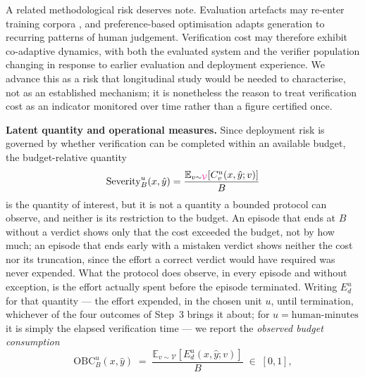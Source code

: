 \documentclass[11pt]{article}
\newcommand{\rev}[1]{\textcolor{magenta}{#1}}
\newcommand{\drift}[1]{\textcolor{cyan!85!black}{#1}}
\newcommand{\viola}[1]{\textcolor[HTML]{7030A0}{#1}}
\newcommand{\rev}[1]{#1}
\newcommand{\drift}[1]{#1}
\newcommand{\viola}[1]{#1}
\begin{document}
\drift{A related methodological risk deserves note. Evaluation artefacts may re-enter training corpora \citep{deng2024contamination}, and preference-based optimisation adapts generation to recurring patterns of human judgement. Verification cost may therefore exhibit co-adaptive dynamics, with both the evaluated system and the verifier population changing in response to earlier evaluation and deployment experience. We advance this as a risk that longitudinal study would be needed to characterise, not as an established mechanism; it is nonetheless the reason to treat verification cost as an indicator monitored over time rather than a figure certified once.}

\viola{\textbf{Latent quantity and operational measures.}} Since deployment risk is governed by whether verification can be completed within an available budget, the budget-relative quantity
\[
\mathrm{Severity}_B^u(x,\hat{y})
=
\frac{\mathbb{E}_{v\sim \rev{\mathcal{V}}}\!\left[C_v^u(x,\hat{y};v)\right]}{B}
\]
\viola{is the quantity of interest, but it is not a quantity a bounded protocol can observe, and neither is its restriction to the budget. An episode that ends at $B$ without a verdict shows only that the cost exceeded the budget, not by how much; an episode that ends early with a mistaken verdict shows neither the cost nor its truncation, since the effort a correct verdict would have required was never expended. What the protocol does observe, in every episode and without exception, is the effort actually spent before the episode terminated. Writing \mbox{$E_d^u$} for that quantity --- the effort expended, in the chosen unit $u$, until termination, whichever of the four outcomes of Step~3 brings it about; for $u=\text{human-minutes}$ it is simply the elapsed verification time --- we report the \emph{observed budget consumption}}
\[
\mathrm{OBC}_B^u(x,\hat{y}) \;=\; \frac{\mathbb{E}_{v\sim\mathcal{V}}\!\left[E_d^u(x,\hat{y};v)\right]}{B} \;\in\; [0,1] ,
\]
\end{document}

